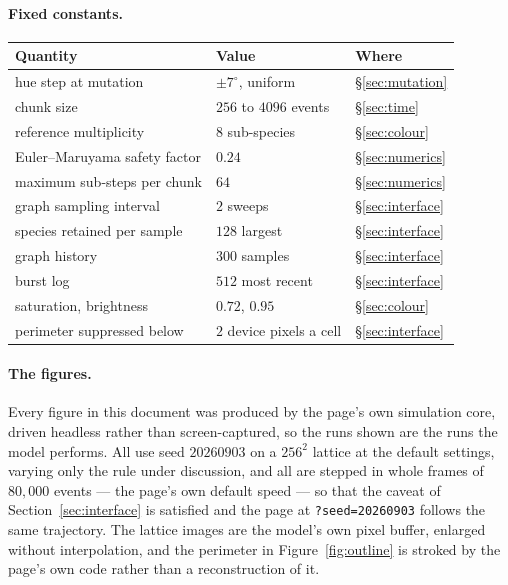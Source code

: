 \documentclass[11pt,a4paper]{article}
\newcommand{\code}[1]{\texttt{#1}}
\begin{document}
\paragraph{Fixed constants.}
\begin{center}
\begin{tabular}{lll}
\toprule
Quantity & Value & Where \\
\midrule
hue step at mutation            & $\pm 7^{\circ}$, uniform & \S\ref{sec:mutation} \\
chunk size                      & $256$ to $4096$ events   & \S\ref{sec:time} \\
reference multiplicity          & $8$ sub-species          & \S\ref{sec:colour} \\
Euler--Maruyama safety factor   & $0.24$                   & \S\ref{sec:numerics} \\
maximum sub-steps per chunk     & $64$                     & \S\ref{sec:numerics} \\
graph sampling interval         & $2$ sweeps               & \S\ref{sec:interface} \\
species retained per sample     & $128$ largest            & \S\ref{sec:interface} \\
graph history                   & $300$ samples            & \S\ref{sec:interface} \\
burst log                       & $512$ most recent        & \S\ref{sec:interface} \\
saturation, brightness          & $0.72$, $0.95$           & \S\ref{sec:colour} \\
perimeter suppressed below       & $2$ device pixels a cell & \S\ref{sec:interface} \\
\bottomrule
\end{tabular}
\end{center}

\paragraph{The figures.} Every figure in this document was produced by the page's own
simulation core, driven headless rather than screen-captured, so the runs shown are the runs
the model performs. All use seed $20260903$ on a $256^2$ lattice at the default settings,
varying only the rule under discussion, and all are stepped in whole frames of $80{,}000$
events --- the page's own default speed --- so that the caveat of
Section~\ref{sec:interface} is satisfied and the page at \code{?seed=20260903} follows the
same trajectory. The lattice images are the model's own pixel buffer, enlarged without
interpolation, and the perimeter in Figure~\ref{fig:outline} is stroked by the page's own
code rather than a reconstruction of it.
\end{document}
